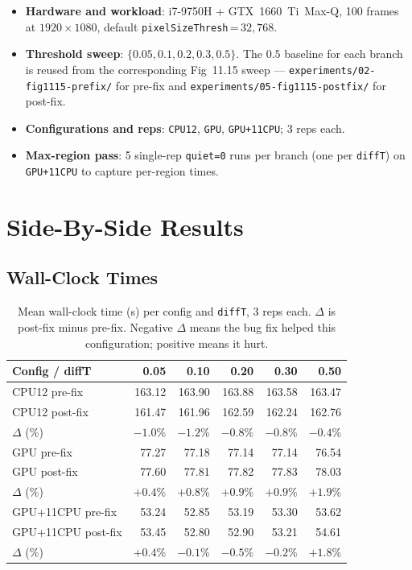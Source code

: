 \documentclass[
	english,
	letterpaper, oneside
]{article}
\begin{document}
\begin{itemize}
    \item \textbf{Hardware and workload}: i7-9750H + GTX~1660~Ti~Max-Q,
    100 frames at $1920\times1080$, default
    \texttt{pixelSizeThresh}\,=\,$32{,}768$.
    \item \textbf{Threshold sweep}: $\{0.05, 0.1, 0.2, 0.3, 0.5\}$.
    The $0.5$ baseline for each branch is reused from the corresponding
    Fig~11.15 sweep --- \texttt{experiments/02-fig1115-prefix/} for pre-fix and
    \texttt{experiments/05-fig1115-postfix/} for post-fix.
    \item \textbf{Configurations and reps}: \texttt{CPU12}, \texttt{GPU},
    \texttt{GPU+11CPU}; 3 reps each.
    \item \textbf{Max-region pass}: 5 single-rep \texttt{quiet=0} runs
    per branch (one per \texttt{diffT}) on \texttt{GPU+11CPU} to
    capture per-region times.
\end{itemize}

\section{Side-By-Side Results}

\subsection{Wall-Clock Times}

\begin{table}[H]
    \centering
    \caption{Mean wall-clock time (s) per config and \texttt{diffT},
             3 reps each. $\Delta$ is post-fix minus pre-fix. Negative
             $\Delta$ means the bug fix helped this
             configuration; positive means it hurt.}
    \label{tab:wall}
    \begin{tabular}{lrrrrr}
        \hline
        Config / diffT & 0.05 & 0.10 & 0.20 & 0.30 & 0.50 \\
        \hline
        CPU12 pre-fix   & 163.12 & 163.90 & 163.88 & 163.58 & 163.47 \\
        CPU12 post-fix  & 161.47 & 161.96 & 162.59 & 162.24 & 162.76 \\
        $\Delta$ (\%)   & $-1.0$\% & $-1.2$\% & $-0.8$\% & $-0.8$\% & $-0.4$\% \\
        \hline
        GPU pre-fix     &  77.27 &  77.18 &  77.14 &  77.14 &  76.54 \\
        GPU post-fix    &  77.60 &  77.81 &  77.82 &  77.83 &  78.03 \\
        $\Delta$ (\%)   & $+0.4$\% & $+0.8$\% & $+0.9$\% & $+0.9$\% & $+1.9$\% \\
        \hline
        GPU+11CPU pre-fix  &  53.24 &  52.85 &  53.19 &  53.30 &  53.62 \\
        GPU+11CPU post-fix &  53.45 &  52.80 &  52.90 &  53.21 &  54.61 \\
        $\Delta$ (\%)      & $+0.4$\% & $-0.1$\% & $-0.5$\% & $-0.2$\% & $+1.8$\% \\
        \hline
    \end{tabular}
\end{table}
\end{document}
